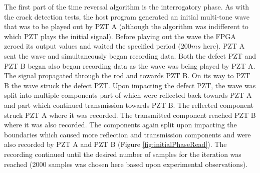 The first part of the time reversal algorithm is the interrogatory phase. As with the crack detection tests, the host program generated an initial multi-tone wave that was to be played out by PZT A (although the algorithm was indifferent to which PZT plays the initial signal). Before playing out the wave the FPGA zeroed its output values and waited the specified period ($200ms$ here). PZT A sent the wave and simultaneously began recording data. Both the defect PZT and PZT B began also began recording data as the wave was being played by PZT A. The signal propagated through the rod and towards PZT B. On its way to PZT B the wave struck the defect PZT. Upon impacting the defect PZT, the wave was split into multiple components part of which were reflected back towards PZT A and part which continued transmission towards PZT B. The reflected component struck PZT A where it was recorded. The transmitted component reached PZT B where it was also recorded. The components again split upon impacting the boundaries which caused more reflection and transmission components and were also recorded by PZT A and PZT B (Figure \ref{fig:initialPhaseRead}). The recording continued until the desired number of samples for the iteration was reached (2000 samples was chosen here based upon experimental observations).


